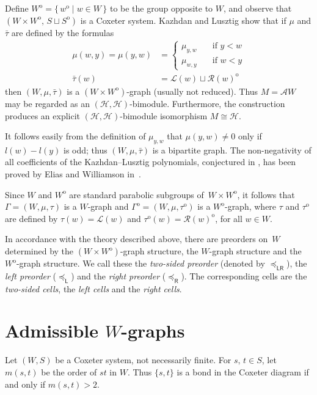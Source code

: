 \documentclass[10pt]{amsart}
\theoremstyle{definition}
\DeclareMathOperator{\orm}{o}
\newcommand{\opp}{^{\orm}}
\newcommand{\leftright}{_{\mathsf{LR}}}
\newcommand{\lside}{_{\mathsf{L}}}
\newcommand{\rside}{_{\mathsf{R}}}
\begin{document}
Define $W\opp=\{\,w\opp\mid w\in W\,\}$ to be the group opposite to $W\!$, and
observe that $(W\times W\opp\!,\,S\sqcup S\opp)$ is a Coxeter system.
Kazhdan and Lusztig show that if $\mu$ and $\bar\tau$ are defined by the formulas
\begin{align*}
\mu(w,y)=\mu(y,w) &= \begin{cases}
 \mu_{y,w} &\quad \text{if $y < w$}\\
 \mu_{w,y} &\quad \text{if $w < y$}
 \end{cases}\\
\bar\tau(w) &= \mathcal{L}(w)\sqcup\mathcal{R}(w)\opp
\end{align*}
then $(W,\mu,\bar\tau)$ is a $(W\times W\opp)$-graph (usually not reduced).
Thus $M=\mathcal{A}W$ may be regarded as an
$(\mathcal{H},\mathcal{H})$-bimodule. Furthermore, the construction
produces an explicit $(\mathcal{H},\mathcal{H})$-bimodule isomorphism
$M\cong\mathcal{H}$.

It follows easily from the definition of $\mu_{y,w}$ that $\mu(y,w)\neq 0$ only
if $l(w)-l(y)$ is odd; thus $(W,\mu,\bar\tau)$ is a bipartite graph. The non-negativity
of all coefficients of the Kazhdan--Lusztig polynomials, conjectured in
\cite{kazlus:coxhecke}, has been proved by Elias
and Williamson in~\cite{bengeogedi:howgesoerge}.

Since $W$ and $W\opp$ are standard parabolic subgroups of~$W\times W\opp$, it follows
that $\Gamma=(W,\mu,\tau)$ is a $W\!$-graph and $\Gamma\opp=(W,\mu,\tau\opp)$ is a
$W\opp\!$-graph, where $\tau$ and $\tau\opp$ are defined by
$\tau(w)=\mathcal{L}(w)$ and $\tau\opp(w)=\mathcal{R}(w)\opp$, for all $w\in W$.

In accordance with the theory described above, there are preorders on~$W$
determined by the $(W\times W\opp)$-graph structure, the $W\!$-graph structure
and the $W\opp\!$-graph structure. We call these the \emph{two-sided preorder}
(denoted by $\preceq\leftright$), the \emph{left preorder} ($\preceq\lside$)
and the \emph{right preorder} ($\preceq\rside$). The
corresponding cells are the \emph{two-sided cells}, the \emph{left cells}
and the \emph{right cells}.

\section{Admissible \texorpdfstring{$W$}{W}-graphs}
\label{sec:5}

Let $(W,S)$ be a Coxeter system, not necessarily finite. For $s,\,t\in S$,
let $m(s,t)$ be the order of $st$ in $W\!$. Thus $\{s,t\}$ is a
bond in the Coxeter diagram if and only if $m(s,t)>2$.
\end{document}
